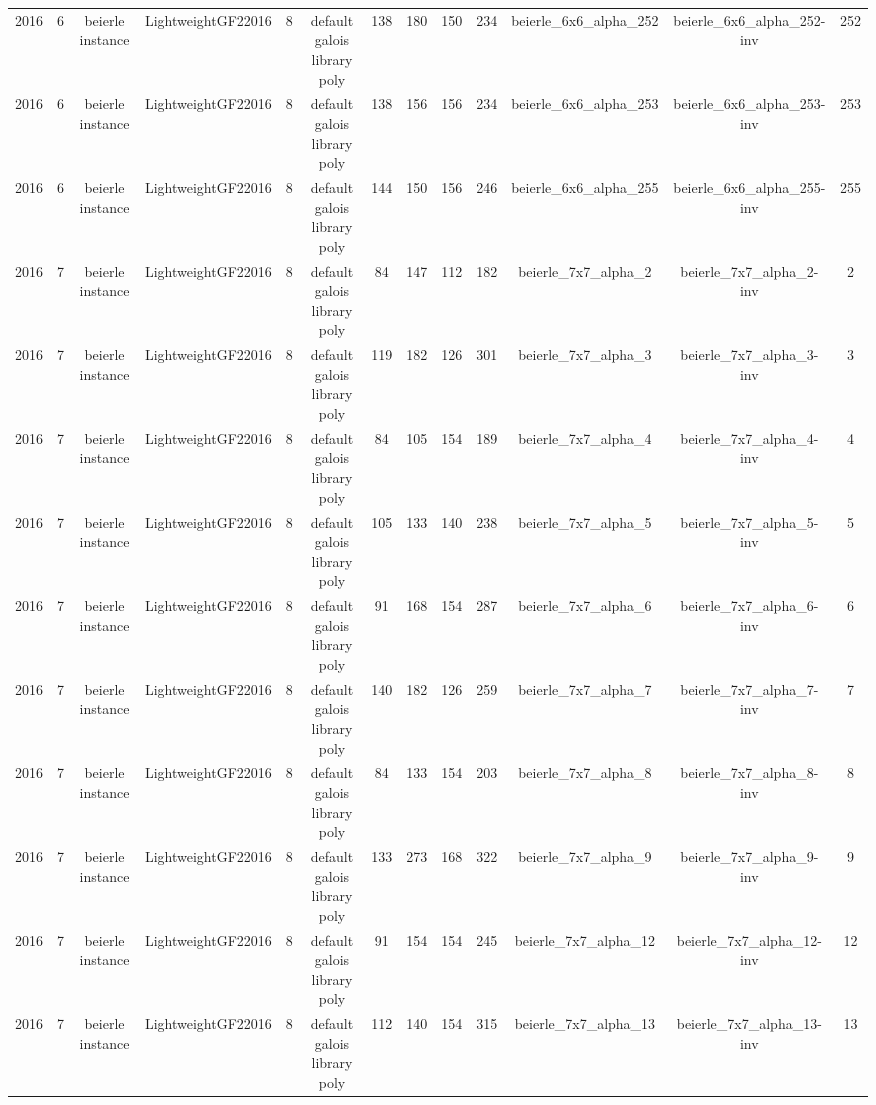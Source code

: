 \begin{tabular}{c c c c c c c c c c c c c}
2016 & 6 & beierle instance & LightweightGF22016 & 8 & default galois library poly & 138 & 180 & 150 & 234 & beierle_6x6_alpha_252 & beierle_6x6_alpha_252-inv & 252 \\
2016 & 6 & beierle instance & LightweightGF22016 & 8 & default galois library poly & 138 & 156 & 156 & 234 & beierle_6x6_alpha_253 & beierle_6x6_alpha_253-inv & 253 \\
2016 & 6 & beierle instance & LightweightGF22016 & 8 & default galois library poly & 144 & 150 & 156 & 246 & beierle_6x6_alpha_255 & beierle_6x6_alpha_255-inv & 255 \\
2016 & 7 & beierle instance & LightweightGF22016 & 8 & default galois library poly & 84 & 147 & 112 & 182 & beierle_7x7_alpha_2 & beierle_7x7_alpha_2-inv & 2 \\
2016 & 7 & beierle instance & LightweightGF22016 & 8 & default galois library poly & 119 & 182 & 126 & 301 & beierle_7x7_alpha_3 & beierle_7x7_alpha_3-inv & 3 \\
2016 & 7 & beierle instance & LightweightGF22016 & 8 & default galois library poly & 84 & 105 & 154 & 189 & beierle_7x7_alpha_4 & beierle_7x7_alpha_4-inv & 4 \\
2016 & 7 & beierle instance & LightweightGF22016 & 8 & default galois library poly & 105 & 133 & 140 & 238 & beierle_7x7_alpha_5 & beierle_7x7_alpha_5-inv & 5 \\
2016 & 7 & beierle instance & LightweightGF22016 & 8 & default galois library poly & 91 & 168 & 154 & 287 & beierle_7x7_alpha_6 & beierle_7x7_alpha_6-inv & 6 \\
2016 & 7 & beierle instance & LightweightGF22016 & 8 & default galois library poly & 140 & 182 & 126 & 259 & beierle_7x7_alpha_7 & beierle_7x7_alpha_7-inv & 7 \\
2016 & 7 & beierle instance & LightweightGF22016 & 8 & default galois library poly & 84 & 133 & 154 & 203 & beierle_7x7_alpha_8 & beierle_7x7_alpha_8-inv & 8 \\
2016 & 7 & beierle instance & LightweightGF22016 & 8 & default galois library poly & 133 & 273 & 168 & 322 & beierle_7x7_alpha_9 & beierle_7x7_alpha_9-inv & 9 \\
2016 & 7 & beierle instance & LightweightGF22016 & 8 & default galois library poly & 91 & 154 & 154 & 245 & beierle_7x7_alpha_12 & beierle_7x7_alpha_12-inv & 12 \\
2016 & 7 & beierle instance & LightweightGF22016 & 8 & default galois library poly & 112 & 140 & 154 & 315 & beierle_7x7_alpha_13 & beierle_7x7_alpha_13-inv & 13 \\

\end{tabular}
